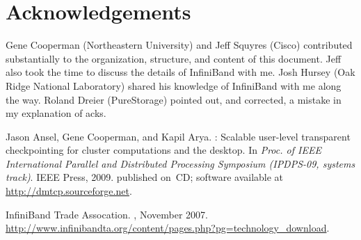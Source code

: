 \documentclass[letterpaper,12pt]{article}
\begin{document}
\section{Acknowledgements} Gene Cooperman (Northeastern University)
and Jeff Squyres (Cisco) contributed substantially to the organization,
structure, and content of this document. Jeff also took the time
to discuss the details of InfiniBand with me. Josh Hursey (Oak Ridge
National Laboratory) shared his knowledge of InfiniBand with me along
the way. Roland Dreier (PureStorage) pointed out, and corrected, a mistake
in my explanation of acks.


\begin{thebibliography}{1}

Jason Ansel, Gene Cooperman, and Kapil Arya.
: Scalable user-level transparent checkpointing for cluster
  computations and the desktop.
\newblock In {\em Proc. of IEEE International Parallel and Distributed
  Processing Symposium (IPDPS-09, systems track)}. IEEE Press, 2009.
\newblock published on~CD; software available at
  \url{http://dmtcp.sourceforge.net}.

InfiniBand Trade Assocation.
,
  November 2007.
\newblock
  \url{http://www.infinibandta.org/content/pages.php?pg=technology_download}.

\end{thebibliography}
\end{document}
